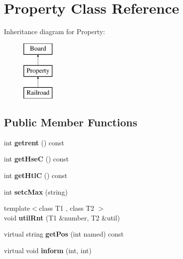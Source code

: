 \hypertarget{class_property}{}\section{Property Class Reference}
\label{class_property}
Inheritance diagram for Property\+:\begin{figure}[H]
\begin{center}
\leavevmode
\includegraphics[height=3.000000cm]{class_property}
\end{center}
\end{figure}
\subsection*{Public Member Functions}
\begin{DoxyCompactItemize}
\item 
\mbox{\label{class_property_a505911a3207cee21c2e656ab9ee794a7}} 
int {\bfseries getrent} () const
\item 
\mbox{\label{class_property_a0f2941a1cfa79baba73ad58f7fb77978}} 
int {\bfseries get\+HseC} () const
\item 
\mbox{\label{class_property_acd727a8ccda5e79aa865205dc4ad5aa3}} 
int {\bfseries get\+HtlC} () const
\item 
\mbox{\label{class_property_ad0e3b17c171e2bbb79ea923e1556ea40}} 
int {\bfseries setc\+Max} (string)
\item 
\mbox{\label{class_property_a824ac426fc7afbf163522586aa7d844e}} 
{\footnotesize template$<$class T1 , class T2 $>$ }\\void {\bfseries util\+Rnt} (T1 \&number, T2 \&util)
\item 
\mbox{\label{class_property_ab3f16b101b063cd7f1b7aa059595a714}} 
virtual string {\bfseries get\+Pos} (int named) const
\item 
\mbox{\label{class_property_af8ee451681c0cfb0d90c417772776e5c}} 
virtual void {\bfseries inform} (int, int)
\end{DoxyCompactItemize}
